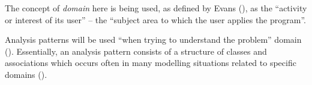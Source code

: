 The concept of \emph{domain} here is being used, as defined by Evans
(\citeyear[][p.~2]{evans2004domain}), as the ``activity or interest of its
user'' -- the ``subject area to which the user applies the program''.

Analysis patterns will be used ``when trying to understand the problem'' domain
(\cite[][Section~1.1]{fowler1997analysis}). Essentially, an analysis pattern
consists of a structure of classes and associations which occurs often in many
modelling situations related to specific domains
(\cite[][p.~254]{bennett2010object}).
